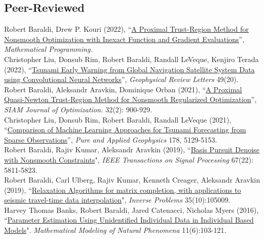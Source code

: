 \documentclass[10pt, a4paper]{article}
\newcommand{\years}[1]{\marginnote{\scriptsize #1}}
\begin{document}
\subsection*{Peer-Reviewed}
\years{2022} Robert Baraldi, Drew P. Kouri (2022), ``\href{https://link.springer.com/article/10.1007/s10107-022-01915-3}{A Proximal Trust-Region Method for Nonsmooth Optimization with Inexact Function and Gradient Evaluations}'', \emph{Mathematical Programming.}\\
\years{2022} Christopher Liu, Donsub Rim, Robert Baraldi, Randall LeVeque, Kenjiro Terada (2022), ``\href{https://agupubs.onlinelibrary.wiley.com/doi/full/10.1029/2022GL099511}{Tsunami Early Warning from Global Navigation Satellite System Data using Convolutional Neural Networks}'', \emph{Geophysical Review Letters} 49(20).\\
\noindent
\years{2021} Robert Baraldi, Aleksandr Aravkin, Dominique Orban (2021), ``\href{https://epubs.siam.org/doi/abs/10.1137/21M1409536}{A Proximal Quasi-Newton Trust-Region Method for Nonsmooth Regularized Optimization}'', \emph{SIAM Journal of Optimization.} 32(2): 900-929.\\
\years{2021} Christopher Liu, Donsub Rim, Robert Baraldi, Randall LeVeque (2021), ``\href{https://link.springer.com/article/10.1007/s00024-021-02841-9}{Comparison of Machine Learning Approaches for Tsunami Forecasting from Sparse Observations}'', \emph{Pure and Applied Geophysics} 178, 5129-5153. \\
\noindent
\years{2019} Robert Baraldi, Rajiv Kumar, Aleksandr Aravkin  (2019), “\href{https://ieeexplore.ieee.org/document/8861392}{Basis Pursuit Denoise with Nonsmooth Constraints}", \emph{IEEE Transactions on Signal Processing} 67(22): 5811-5823.\\
\years{2019} Robert Baraldi, Carl Ulberg, Rajiv Kumar, Kenneth Creager, Aleksandr Aravkin (2019), “\href{https://iopscience.iop.org/article/10.1088/1361-6420/ab3204}{Relaxation Algorithms for matrix completion, with applications to seismic travel-time data interpolation}", \emph{Inverse Problems} 35(10):105009. \\
\years{2016a} Harvey Thomas Banks, Robert Baraldi, Jared Catenacci, Nicholas Myers (2016), “\href{https://www.ncsu.edu/crsc/reports/ftp/pdf/crsc-tr16-04.pdf}{Parameter Estimation Using Unidentified Individual Data in Individual Based Models}". \emph{Mathematical Modeling of Natural Phenomena} 11(6):103-121.\\
\end{document}
